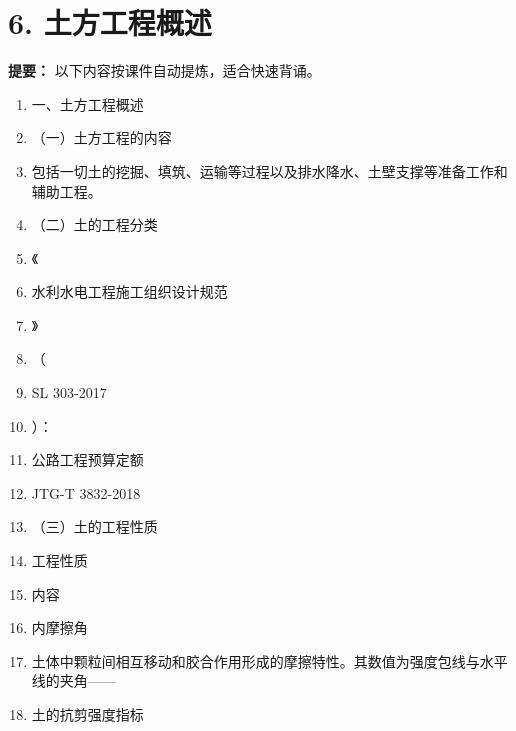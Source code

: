 \documentclass[UTF8,fontset=fandol,11pt]{ctexart}
\begin{document}
\newpage

\section*{6. 土方工程概述}


\begin{mainbox}

\textbf{提要：} 以下内容按课件自动提炼，适合快速背诵。

\end{mainbox}

\begin{enumerate}[label=\arabic*.]

\item 一、土方工程概述

\item （一）土方工程的内容

\item 包括一切土的挖掘、填筑、运输等过程以及排水降水、土壁支撑等准备工作和辅助工程。

\item （二）土的工程分类

\item 《

\item 水利水电工程施工组织设计规范

\item 》

\item （

\item SL 303-2017

\item ）：

\item 公路工程预算定额

\item JTG-T 3832-2018

\item （三）土的工程性质

\item 工程性质

\item 内容

\item 内摩擦角

\item 土体中颗粒间相互移动和胶合作用形成的摩擦特性。其数值为强度包线与水平线的夹角——

\item 土的抗剪强度指标


\end{enumerate}
\end{document}
